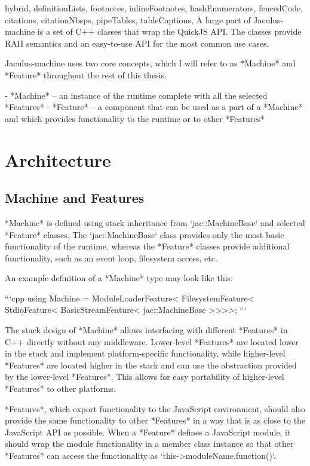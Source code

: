 \documentclass[
  digital,
  oneside,
  nosansbold,
  nocolorbold,
  lof,
  lot
]{fithesis4}
\begin{document}
\begin{markdown*}{%
  hybrid,
  definitionLists,
  footnotes,
  inlineFootnotes,
  hashEnumerators,
  fencedCode,
  citations,
  citationNbsps,
  pipeTables,
  tableCaptions,
}
A large part of Jaculus-machine is a set of C++ classes that wrap the QuickJS API. The classes provide RAII semantics and an easy-to-use API for the most common use cases.

Jaculus-machine uses two core concepts, which I will refer to as *Machine* and *Feature* throughout the rest of this thesis.

  - *Machine* -- an instance of the runtime complete with all the selected *Features*
  - *Feature* -- a component that can be used as a part of a *Machine* and which provides functionality to the runtime or to other *Features*

\section{Architecture}

\subsection{Machine and Features}

*Machine* is defined using stack inheritance from `jac::MachineBase` and selected *Feature* classes. The `jac::MachineBase` class provides only the most basic functionality of the runtime, whereas the *Feature* classes provide additional functionality, such as an event loop, filesystem access, etc.

An example definition of a *Machine* type may look like this:

```cpp
using Machine =
    ModuleLoaderFeature<
    FilesystemFeature<
    StdioFeature<
    BasicStreamFeature<
    jac::MachineBase
>>>>;
```

The stack design of *Machine* allows interfacing with different *Features* in C++ directly without any middleware. Lower-level *Features* are located lower in the stack and implement platform-specific functionality, while higher-level *Features* are located higher in the stack and can use the abstraction provided by the lower-level *Features*. This allows for easy portability of higher-level *Features* to other platforms.

*Features*, which export functionality to the JavaScript environment, should also provide the same functionality to other *Features* in a way that is as close to the JavaScript API as possible. When a *Feature* defines a JavaScript module, it should wrap the module functionality in a member class instance so that other *Features* can access the functionality as `this->moduleName.function()`.


\end{markdown*}
\end{document}
